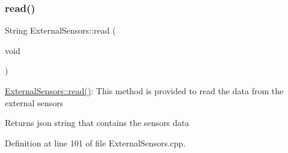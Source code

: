 \subsubsection{\texorpdfstring{read()}{read()}}
{\footnotesize\ttfamily String External\+Sensors\+::read (\begin{DoxyParamCaption}\item[{void}]{ }\end{DoxyParamCaption})}

\hyperlink{class_external_sensors_a53177b81eca3be89508b5511ddcd00fc}{External\+Sensors\+::read()}\+: This method is provided to read the data from the external sensors

\begin{DoxyReturn}{Returns}
json string that contains the sensors data 
\end{DoxyReturn}


Definition at line 101 of file External\+Sensors.\+cpp.


